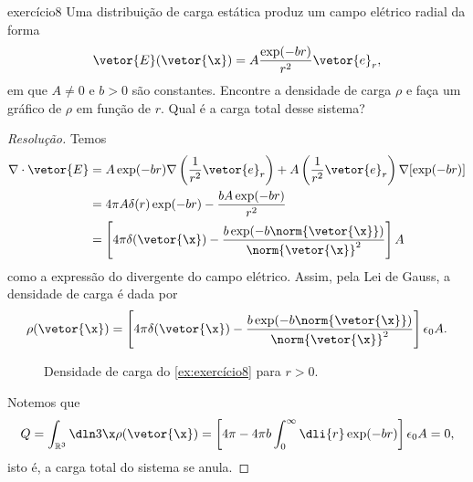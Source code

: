 \begin{exercício}{}{exercício8}
    Uma distribuição de carga estática produz um campo elétrico radial da forma
    \begin{equation*}
        \vetor{E}(\vetor{\x}) = A\frac{\exp(-br)}{r^2}\vetor{e}_r,
    \end{equation*}
    em que \(A \neq 0\) e \(b > 0\) são constantes. Encontre a densidade de carga \(\rho\) e faça um gráfico de \(\rho\) em função de \(r\). Qual é a carga total desse sistema?
\end{exercício}
\begin{proof}[Resolução]
    Temos
    \begin{align*}
        \nabla \cdot \vetor{E} &= A \exp(-br)\nabla\left(\frac1{r^2}\vetor{e}_r\right) + A \left(\frac{1}{r^2}\vetor{e}_r\right)\nabla[\exp(-br)]\\
        &= 4\pi A \delta(r) \exp(-br) - \frac{bA\exp(-br)}{r^2}\\
        &= \left[4\pi \delta(\vetor{\x}) - \frac{b \exp(-b\norm{\vetor{\x}})}{\norm{\vetor{\x}}^2}\right]A
    \end{align*}
    como a expressão do divergente do campo elétrico. Assim, pela Lei de Gauss, a densidade de carga é dada por
    \begin{equation*}
        \rho(\vetor{\x}) = \left[4\pi \delta(\vetor{\x}) - \frac{b \exp(-b\norm{\vetor{\x}})}{\norm{\vetor{\x}}^2}\right]\epsilon_0 A.
    \end{equation*}

    \begin{figure}[!ht]
        \centering
        \caption{Densidade de carga do \cref{ex:exercício8} para \(r > 0\).}
    \end{figure}

    Notemos que
    \begin{align*}
        Q = \int_{\mathbb{R}^3} \dln3\x \rho(\vetor{\x}) = \left[4\pi - 4\pi b \int_{0}^\infty \dli{r} \exp(-br)\right]\epsilon_0 A = 0,
    \end{align*}
    isto é, a carga total do sistema se anula.
\end{proof}
